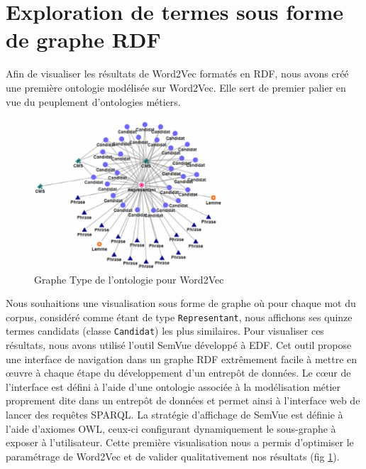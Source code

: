 \section{Exploration de termes sous forme de graphe RDF}

Afin de visualiser les résultats de Word2Vec formatés en RDF, nous avons créé une première ontologie modélisée sur Word2Vec. Elle sert de premier palier en vue du peuplement d'ontologies métiers.
%
\begin{figure}[tb]
    \begin{center}
        \includegraphics[width=7cm]{figures/gtype}
    \end{center}
    \caption{Graphe Type de l’ontologie pour Word2Vec}\label{fig:gtype}
\end{figure}
%
Nous souhaitions une visualisation sous forme de graphe où pour chaque mot du corpus, considéré comme étant de type \texttt{Representant}, nous affichons ses quinze termes candidats (classe \texttt{Candidat}) les plus similaires.
Pour visualiser ces résultats, nous avons utilisé l'outil SemVue développé à EDF. Cet outil propose une interface de navigation dans un graphe RDF extrêmement facile à mettre en œuvre à chaque étape du développement d’un entrepôt de données. Le cœur de l’interface est défini à l’aide d’une ontologie associée à la modélisation métier proprement dite dans un entrepôt de données \cite{mnpho14parallel-materialisation-RDFox} et permet ainsi à l’interface web de lancer des requêtes SPARQL. La stratégie d’affichage de SemVue est définie à l’aide d’axiomes OWL, ceux-ci configurant dynamiquement le sous-graphe à exposer à l’utilisateur.
Cette première visualisation nous a permis d'optimiser le paramétrage de Word2Vec et de valider qualitativement nos résultats (fig \ref{fig:gtype}).
%
